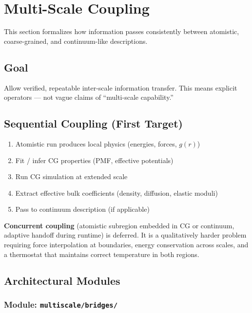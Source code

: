 \documentclass[11pt]{article}
\begin{document}
\section{Multi-Scale Coupling}
\label{sec:multiscale}

This section formalizes how information passes consistently between
atomistic, coarse-grained, and continuum-like descriptions.

\subsection{Goal}

Allow verified, repeatable inter-scale information transfer.  This means
explicit operators --- not vague claims of ``multi-scale capability.''

\subsection{Sequential Coupling (First Target)}

\begin{enumerate}
  \item Atomistic run produces local physics (energies, forces, $g(r)$)
  \item Fit / infer CG properties (PMF, effective potentials)
  \item Run CG simulation at extended scale
  \item Extract effective bulk coefficients (density, diffusion, elastic moduli)
  \item Pass to continuum description (if applicable)
\end{enumerate}

\textbf{Concurrent coupling} (atomistic subregion embedded in CG or
continuum, adaptive handoff during runtime) is deferred.  It is a
qualitatively harder problem requiring force interpolation at boundaries,
energy conservation across scales, and a thermostat that maintains correct
temperature in both regions.

\subsection{Architectural Modules}

\subsubsection{Module: \texttt{multiscale/bridges/}}
\end{document}
